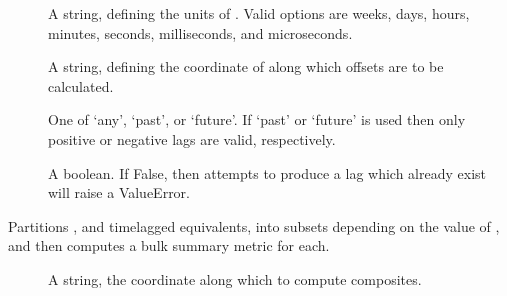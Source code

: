 \documentclass[letterpaper,10pt,english]{sphinxmanual}
\begin{document}
\begin{fulllineitems}
\begin{fulllineitems}
\sphinxAtStartPar
{}
\begin{description}
\item[{}] \leavevmode
\sphinxAtStartPar
A string, defining the units of . Valid options are weeks, days, hours, minutes, seconds, milliseconds, and microseconds.

\item[{}] \leavevmode
\sphinxAtStartPar
A string, defining the coordinate of  along which offsets are to be calculated.

\item[{}] \leavevmode
\sphinxAtStartPar
One of ‘any’, ‘past’, or ‘future’. If ‘past’ or ‘future’ is used then only positive or negative lags are valid, respectively.

\item[{}] \leavevmode
\sphinxAtStartPar
A boolean. If False, then attempts to produce a lag which already exist will raise a ValueError.

\end{description}

\end{fulllineitems}


\begin{fulllineitems}
\label{\detokenize{docs/composites:composites.LaggedAnalyser.compute_composites}}
\pysigstartsignatures
{}
\pysigstopsignatures
\sphinxAtStartPar
Partitions , and time\sphinxhyphen{}lagged equivalents, into subsets depending on the value of , and then computes a bulk summary metric for each.

\sphinxAtStartPar
{}
\begin{description}
\item[{}] \leavevmode
\sphinxAtStartPar
A string, the coordinate along which to compute composites.


\end{description}
\end{fulllineitems}
\end{fulllineitems}
\end{document}
